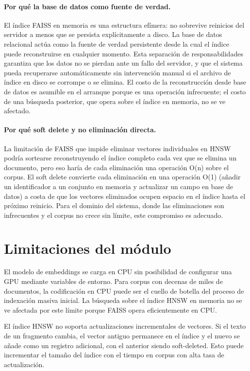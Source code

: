\documentclass[11pt]{article}
\begin{document}
\paragraph{Por qué la base de datos como fuente de verdad.}
El índice FAISS en memoria es una estructura efímera: no sobrevive reinicios del servidor a
menos que se persista explícitamente a disco. La base de datos relacional actúa como la fuente
de verdad persistente desde la cual el índice puede reconstruirse en cualquier momento. Esta
separación de responsabilidades garantiza que los datos no se pierdan ante un fallo del
servidor, y que el sistema pueda recuperarse automáticamente sin intervención manual si el
archivo de índice en disco se corrompe o se elimina. El costo de la reconstrucción desde base
de datos es asumible en el arranque porque es una operación infrecuente; el costo de una
búsqueda posterior, que opera sobre el índice en memoria, no se ve afectado.

\paragraph{Por qué soft delete y no eliminación directa.}
La limitación de FAISS que impide eliminar vectores individuales en HNSW podría sortearse
reconstruyendo el índice completo cada vez que se elimina un documento, pero eso haría de
cada eliminación una operación O(n) sobre el corpus. El soft delete convierte cada eliminación
en una operación O(1) (añadir un identificador a un conjunto en memoria y actualizar un campo
en base de datos) a costa de que los vectores eliminados ocupen espacio en el índice hasta el
próximo reinicio. Para el dominio del sistema, donde las eliminaciones son infrecuentes y el
corpus no crece sin límite, este compromiso es adecuado.

\section{Limitaciones del módulo}

El modelo de embeddings se carga en CPU sin posibilidad de configurar una GPU mediante
variables de entorno. Para corpus con decenas de miles de documentos, la codificación en CPU
puede ser el cuello de botella del proceso de indexación masiva inicial. La búsqueda sobre el
índice HNSW en memoria no se ve afectada por este límite porque FAISS opera eficientemente
en CPU.

El índice HNSW no soporta actualizaciones incrementales de vectores. Si el texto de un
fragmento cambia, el vector antiguo permanece en el índice y el nuevo se añade como un
registro adicional, con el anterior siendo soft-deleted. Esto puede incrementar el tamaño del
índice con el tiempo en corpus con alta tasa de actualización.
\end{document}
